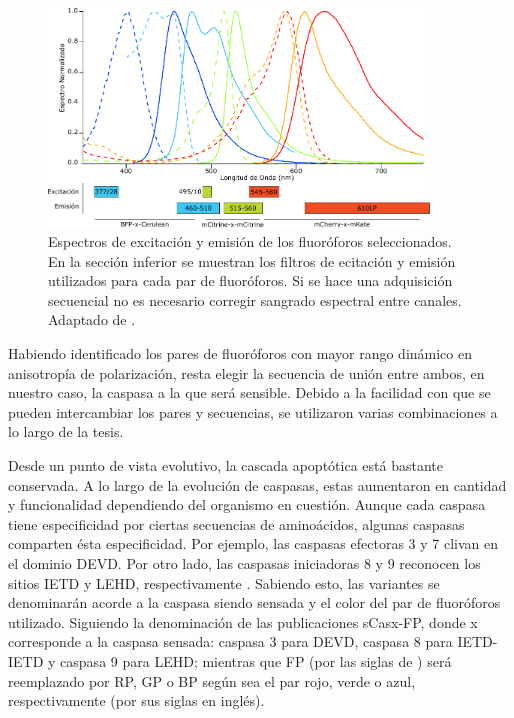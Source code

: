 \begin{figure}[t!]
    \centering
    \includegraphics[width=0.9\textwidth]{img/cap_3/fluospectra.pdf}
    \caption{\footnotesize{Espectros de excitación y emisión de los fluoróforos seleccionados. En la sección inferior se muestran los filtros de ecitación y emisión utilizados para cada par de fluoróforos. Si se hace una adquisición secuencial no es necesario corregir sangrado espectral entre canales. Adaptado de \cite{Corbat2018}.}}
    \label{fig:fluospectra}
\end{figure}

Habiendo identificado los pares de fluoróforos con mayor rango dinámico en anisotropía de polarización, resta elegir la secuencia de unión entre ambos, en nuestro caso, la caspasa a la que será sensible. Debido a la facilidad con que se pueden intercambiar los pares y secuencias, se utilizaron varias combinaciones a lo largo de la tesis.

Desde un punto de vista evolutivo, la cascada apoptótica está bastante conservada. A lo largo de la evolución de caspasas, estas aumentaron en cantidad y funcionalidad dependiendo del organismo en cuestión. Aunque cada caspasa tiene especificidad por ciertas secuencias de aminoácidos, algunas caspasas comparten ésta especificidad. Por ejemplo, las caspasas efectoras 3 y 7 clivan en el dominio DEVD. Por otro lado, las caspasas iniciadoras 8 y 9 reconocen los sitios IETD y LEHD, respectivamente \citep{Sakamaki2009}. Sabiendo esto, las variantes se denominarán acorde a la caspasa siendo sensada y el color del par de fluoróforos utilizado. Siguiendo la denominación de las publicaciones sCasx-FP, donde x corresponde a la caspasa sensada: caspasa 3 para DEVD, caspasa 8 para IETD-IETD y caspasa 9 para LEHD; mientras que FP (por las siglas de ) será reemplazado por RP, GP o BP según sea el par rojo, verde o azul, respectivamente (por sus siglas en inglés).

